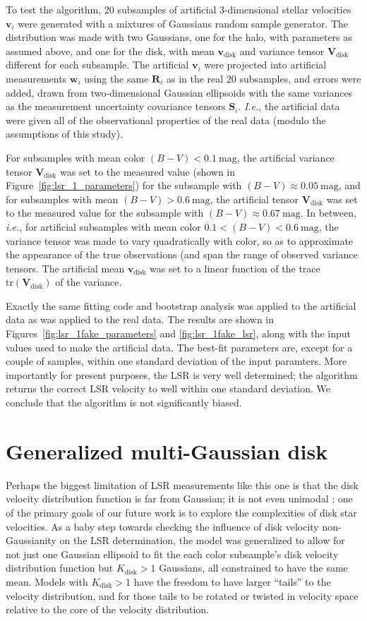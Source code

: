\documentclass[12pt,preprint]{aastex}
\newcommand{\latin}[1]{\textit{#1}}
\newcommand{\ie}{\latin{i.e.}}
\newcommand{\Ie}{\latin{I.e.}}
\renewcommand{\vec}[1]{\mathbf{#1}} %
\newcommand{\vv}{\vec{v}}
\newcommand{\ww}{\vec{w}}
\newcommand{\vvi}{\vv_i}
\newcommand{\vvdisk}{\vv_\mathrm{disk}}
\newcommand{\Kdisk}{K_\mathrm{disk}}
\newcommand{\wwi}{\ww_i}
\newcommand{\ten}[1]{\mathbf{#1}} %
\newcommand{\RR}{\ten{R}}
\renewcommand{\SS}{\ten{S}}
\newcommand{\VV}{\ten{V}}
\newcommand{\RRi}{\RR_i}
\newcommand{\SSi}{\SS_i}
\newcommand{\VVdisk}{\VV_\mathrm{\!disk}}
\newcommand{\tr}{\mathrm{tr}}                 %
\begin{document}
To test the algorithm, 20 subsamples of artificial 3-dimensional
stellar velocities $\vvi$ were generated with a mixtures of Gaussians
random sample generator.  The distribution was made with two
Gaussians, one for the halo, with parameters as assumed above, and one
for the disk, with mean $\vvdisk$ and variance tensor $\VVdisk$
different for each subsample.  The artificial $\vvi$ were projected
into artificial measurements $\wwi$ using the same $\RRi$ as in the
real 20 subsamples, and errors were added, drawn from two-dimensional
Gaussian ellipsoids with the same variances as the measurement
uncertainty covariance tensors $\SSi$.  \Ie, the artificial data were
given all of the observational properties of the real data (modulo the
assumptions of this study).

For subsamples with mean color $(B-V)< 0.1~\mathrm{mag}$, the
artificial variance tensor $\VVdisk$ was set to the measured value
(shown in Figure~\ref{fig:lsr_1_parameters}) for the subsample with
$(B-V)\approx 0.05~\mathrm{mag}$, and for subsamples with mean $(B-V)>
0.6~\mathrm{mag}$, the artificial tensor $\VVdisk$ was set to the
measured value for the subsample with $(B-V)\approx
0.67~\mathrm{mag}$.  In between, \ie, for artificial subsamples with
mean color $0.1 < (B-V) < 0.6~\mathrm{mag}$, the variance tensor was
made to vary quadratically with color, so as to approximate the
appearance of the true observations (and span the range of observed
variance tensors.  The artificial mean $\vvdisk$ was set to a linear
function of the trace $\tr(\VVdisk)$ of the variance.

Exactly the same fitting code and bootstrap analysis was applied to
the artificial data as was applied to the real data.  The results are
shown in Figures~\ref{fig:lsr_1fake_parameters} and
\ref{fig:lsr_1fake_lsr}, along with the input values used to make the
artificial data.  The best-fit parameters are, except for a couple of
samples, within one standard deviation of the input paramters.  More
importantly for present purposes, the LSR is very well determined; the
algorithm returns the correct LSR velocity to well within one standard
deviation.  We conclude that the algorithm is not significantly
biased.

\section{Generalized multi-Gaussian disk}

Perhaps the biggest limitation of LSR measurements like this one is
that the disk velocity distribution function is far from Gaussian; it
is not even unimodal \citep{dehnen98b, skuljan99a, chereul98a}; one of
the primary goals of our future work is to explore the complexities of
disk star velocities.  As a baby step towards checking the influence
of disk velocity non-Gaussianity on the LSR determination, the model
was generalized to allow for not just one Gaussian ellipsoid to fit
the each color subsample's disk velocity distribution function but
$\Kdisk>1$ Gaussians, all constrained to have the same mean.  Models
with $\Kdisk>1$ have the freedom to have larger ``tails'' to the
velocity distribution, and for those tails to be rotated or twisted in
velocity space relative to the core of the velocity distribution.
\end{document}
